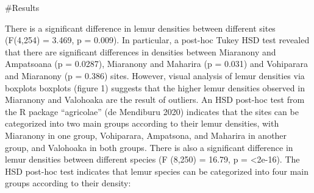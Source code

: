 \documentclass[
  12pt,
]{article}
\begin{document}
\#Results

There is a significant difference in lemur densities between different
sites (F(4,254) = 3.469, p = 0.009). In particular, a post-hoc Tukey HSD
test revealed that there are significant differences in densities
between Miaranony and Ampatsoana (p = 0.0287), Miaranony and Maharira (p
= 0.031) and Vohiparara and Miaranony (p = 0.386) sites. However, visual
analysis of lemur densities via boxplots boxplots (figure 1) suggests
that the higher lemur densities observed in Miaranony and Valohoaka are
the result of outliers. An HSD post-hoc test from the R package
``agricolae'' (de Mendiburu 2020) indicates that the sites can be
categorized into two main groups according to their lemur densities,
with Miaranony in one group, Vohiparara, Ampatsona, and Maharira in
another group, and Valohoaka in both groups. There is also a significant
difference in lemur densities between different species (F (8,250) =
16.79, p = \textless2e-16). The HSD post-hoc test indicates that lemur
species can be categorized into four main groups according to their
density:
\end{document}
